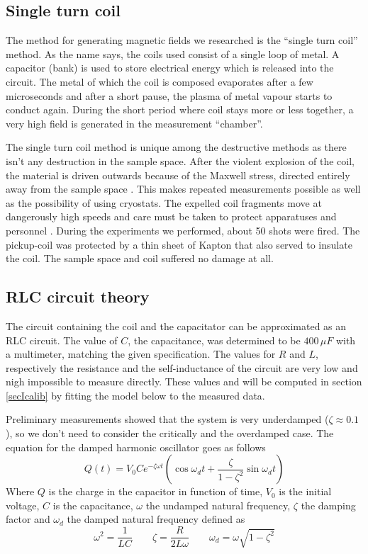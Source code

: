 \subsection{Single turn coil}

The method for generating magnetic fields we researched is the ``single 
turn coil'' method. As the name says, the coils used consist of a single 
loop of metal. A capacitor (bank) is used to store electrical energy which 
is released into the circuit. The metal of which the coil is composed 
evaporates after a few microseconds and after a short pause, the plasma of 
metal vapour starts to conduct again. During the short period where coil 
stays more or less together, a very high field is generated in the 
measurement ``chamber''. 

The single turn coil method is unique among the destructive methods as 
there isn't any destruction in the sample space. After the violent 
explosion of the coil, the material is driven outwards because of the 
Maxwell stress, directed entirely away from the sample space 
\cite{herlachArticle}.  This makes repeated measurements possible as well 
as the possibility of using cryostats. The expelled coil fragments move at 
dangerously high speeds and care must be taken to protect apparatuses and 
personnel \cite{singleTurn}. During the experiments we performed, about 50 
shots were fired. The pickup-coil was protected by a thin sheet of Kapton 
that also served to insulate the coil. The sample space and coil suffered 
no damage at all.

\subsection{RLC circuit theory}

The circuit containing the coil and the capacitator can be approximated as 
an RLC circuit. The value of $C$, the capacitance, was determined to be 
$400\,\mu F$ with a multimeter, matching the given specification. The 
values for $R$ and $L$, respectively the resistance and the self-inductance 
of the circuit are very low and nigh impossible to measure directly. These 
values and will be computed in section \ref{secIcalib} by fitting the model 
below to the measured data.

Preliminary measurements showed that the system is very underdamped ($\zeta 
\approx 0.1$), so we don't need to consider the critically and the 
overdamped case.  The equation for the damped harmonic oscillator goes as 
follows \cite{serway}
\begin{equation}
Q(t) = V_0 C e^{-\zeta \omega t} \left( \cos{\omega_d t} + \frac{\zeta} 
{1-\zeta^2} \sin{\omega_d t}\right)
\end{equation}
Where $Q$ is the charge in the capacitor in function of time, $V_0$ is the 
initial voltage, $C$ is the capacitance, $\omega$ the undamped natural 
frequency, $\zeta$ the damping factor and $\omega_d$ the damped natural 
frequency defined as
$$
\omega^2 = \frac{1}{LC} \qquad
\zeta = \frac{R}{2L \omega} \qquad
\omega_d = \omega \sqrt{1-\zeta^2}
$$

